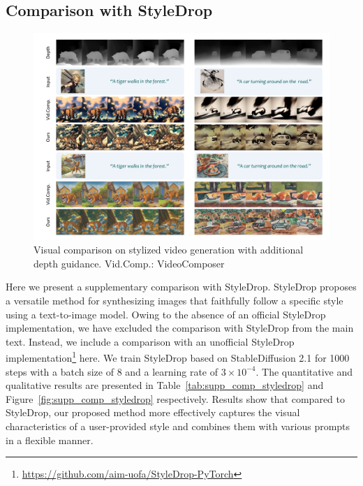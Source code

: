 \vspace{-1.0em}
\subsection{Comparison with StyleDrop}

\begin{figure}[!t]
    \centering
    \includegraphics[width=\linewidth]{figures/supp/result_depth.pdf}
    \vspace{-2em}
    \caption{Visual comparison on stylized video generation with additional depth guidance. Vid.Comp.: VideoComposer} 
    \label{fig:supp_depth}
\end{figure}


Here we present a supplementary comparison with StyleDrop\cite{sohn2023styledrop}. StyleDrop proposes a versatile method for synthesizing images that faithfully follow a specific style using a text-to-image model. Owing to the absence of an official StyleDrop implementation, we have excluded the comparison with StyleDrop from the main text. Instead, we include a comparison with an unofficial StyleDrop implementation\footnote{\url{https://github.com/aim-uofa/StyleDrop-PyTorch}} here. We train StyleDrop based on StableDiffusion 2.1 for 1000 steps with a batch size of 8 and a learning rate of $3 \times 10^{-4}$. The quantitative and qualitative results are presented in Table~\ref{tab:supp_comp_styledrop} and Figure~\ref{fig:supp_comp_styledrop} respectively. Results show that compared to StyleDrop, our proposed method more effectively captures the visual characteristics of a user-provided style and combines them with various prompts in a flexible manner.

